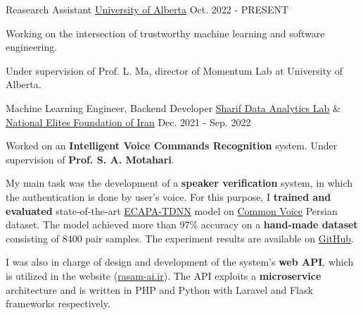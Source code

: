 

\begin{cventries}

  \cventry
    {Reasearch Assistant} %
    {\href{https://www.ualberta.ca/index.html}{University of Alberta}} %
    {} %
    {Oct. 2022 - PRESENT} %
    {
      \begin{cvitems} %
        \item {Working on the intersection of trustworthy machine learning and software engineering.}
        \item {Under supervision of Prof. L. Ma, director of Momentum Lab at University of Alberta.}
      \end{cvitems}
    }

  \cventry
    {Machine Learning Engineer, Backend Developer} %
    {\href{https://www.sharif.edu/}{Sharif Data Analytics Lab} \& \href{https://en.bmn.ir/}{National Elites Foundation of Iran}} %
    {} %
    {Dec. 2021 - Sep. 2022} %
    {
      \begin{cvitems} %
        \item {Worked on an \textbf{Intelligent Voice Commands Recognition} system. Under supervision of \textbf{Prof. S. A. Motahari}.}
        \item {My main task was the development of a \textbf{speaker verification} system, in which the authentication is done by user's voice. For this purpose, I \textbf{trained and evaluated} state-of-the-art \href{https://arxiv.org/abs/2005.07143}{ECAPA-TDNN} model on \href{https://commonvoice.mozilla.org}{Common Voice} Persian dataset. The model achieved more than 97\% accuracy on a \textbf{hand-made dataset} consisting of 8400 pair samples. The experiment results are available on \href{https://github.com/radinshayanfar/speaker-verification}{GitHub}.}
        \item{I was also in charge of design and development of the system's \textbf{web API}, which is utilized in the website (\href{https://rasam-ai.ir/}{rasam-ai.ir}). The API exploits a \textbf{microservice} architecture and is written in PHP and Python with Laravel and Flask frameworks respectively.}
      \end{cvitems}
    }


\end{cventries}
